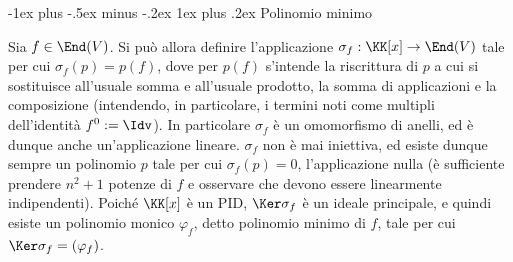 \documentclass[10pt,landscape]{article}
\makeatletter
\renewcommand{\subsubsection}{\@startsection{subsubsection}{3}{0mm}%
	{-1ex plus -.5ex minus -.2ex}%
	{1ex plus .2ex}%
	{\normalfont\small\bfseries}}
\makeatother
\begin{document}
\begin{multicols}{3}
		\subsubsection{Polinomio minimo}
		
		Sia $f \in \End(V)$. Si può allora definire l'applicazione $\sigma_f : \KK[x] \to \End(V)$
		tale per cui $\sigma_f(p) = p(f)$, dove per $p(f)$ s'intende
		la riscrittura di $p$ a cui si sostituisce all'usuale
		somma e all'usuale prodotto, la somma di applicazioni
		e la composizione (intendendo, in particolare, i termini
		noti come multipli dell'identità $f^0 := \Idv$). In particolare $\sigma_f$ è un omomorfismo di anelli,
		ed è dunque anche un'applicazione lineare. $\sigma_f$ non
		è mai iniettiva, ed esiste dunque sempre un polinomio $p$
		tale per cui $\sigma_f(p) = 0$, l'applicazione nulla (è
		sufficiente prendere $n^2+1$ potenze di $f$ e osservare
		che devono essere linearmente indipendenti). Poiché
		$\KK[x]$ è un PID, $\Ker \sigma_f$ è un ideale principale,
		e quindi esiste un polinomio monico $\varphi_f$, detto
		polinomio minimo di $f$, tale per cui
		$\Ker \sigma_f = (\varphi_f)$.
		

\end{multicols}
\end{document}
